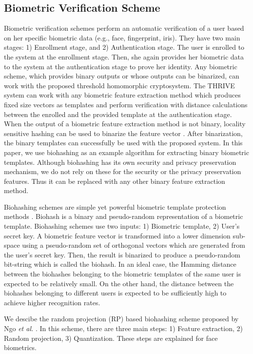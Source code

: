 \documentclass[journal]{IEEEtran}
\begin{document}
\subsection{Biometric Verification Scheme}

Biometric verification schemes perform an automatic verification of a user based on her specific biometric data (e.g., face, fingerprint, iris). They have two main stages: 1) Enrollment stage, and 2) Authentication stage. The user is enrolled to the system at the enrollment stage. Then, she again provides her biometric data to the system at the authentication stage to prove her identity. Any biometric scheme, which provides binary outputs or whose outputs can be binarized, can work with the proposed threshold homomorphic cryptosystem. The THRIVE system can work with any biometric feature extraction method which produces fixed size vectors as templates and perform verification with distance calculations between the enrolled and the provided template at the authentication stage. When the output of a biometric feature extraction method is not binary, locality sensitive hashing can be used to binarize the feature vector \cite{gionis}. After binarization, the binary templates can successfully be used with the proposed system. In this paper, we use biohashing as an example algorithm for extracting binary biometric templates. Although biohashing has its own security and privacy preservation mechanism, we do not rely on these for the security or the privacy preservation features. Thus it can be replaced with any other binary feature extraction method.


Biohashing schemes are simple yet powerful biometric template protection methods \cite{Karabat, Bai, Kuan, Rathgeb, Lumini}. Biohash is a binary and pseudo-random representation of a biometric template. Biohashing schemes use two inputs: 1) Biometric template, 2) User's secret key. A biometric feature vector is transformed into a lower dimension sub-space using a pseudo-random set of orthogonal vectors which are generated from the user's secret key. Then, the result is binarized to produce a pseudo-random bit-string which is called the biohash. In an ideal case, the Hamming distance between the biohashes belonging to the biometric templates of the same user is expected to be relatively small. On the other hand, the distance between the biohashes belonging to different users is expected to be sufficiently high to achieve higher recognition rates.  

We descibe the random projection (RP) based biohashing scheme proposed by Ngo \textit{et al.} \cite{Ngo}. In this scheme, there are three main steps: 1) Feature extraction, 2) Random projection, 3) Quantization. These steps are explained for face biometrics.
\end{document}
